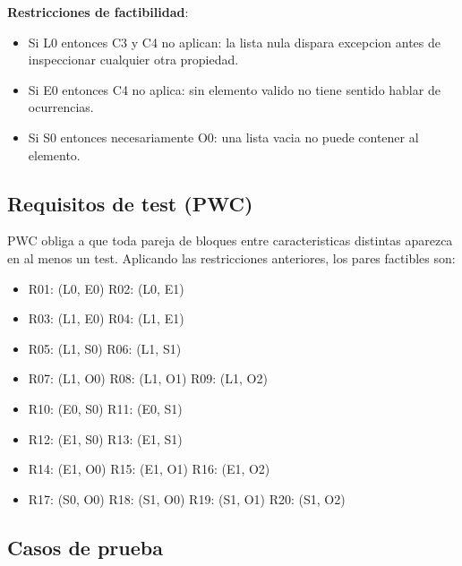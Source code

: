 \documentclass[12pt,a4paper]{article}
\begin{document}
\textbf{Restricciones de factibilidad}:
\begin{itemize}
  \item Si L0 entonces C3 y C4 no aplican: la lista nula dispara excepcion antes de inspeccionar
  cualquier otra propiedad.
  \item Si E0 entonces C4 no aplica: sin elemento valido no tiene sentido hablar de ocurrencias.
  \item Si S0 entonces necesariamente O0: una lista vacia no puede contener al elemento.
\end{itemize}

\subsection{Requisitos de test (PWC)}

PWC obliga a que toda pareja de bloques entre caracteristicas distintas aparezca en al menos un
test. Aplicando las restricciones anteriores, los pares factibles son:

\begin{itemize}[itemsep=0.05em]
  \item R01: (L0, E0) \quad R02: (L0, E1)
  \item R03: (L1, E0) \quad R04: (L1, E1)
  \item R05: (L1, S0) \quad R06: (L1, S1)
  \item R07: (L1, O0) \quad R08: (L1, O1) \quad R09: (L1, O2)
  \item R10: (E0, S0) \quad R11: (E0, S1)
  \item R12: (E1, S0) \quad R13: (E1, S1)
  \item R14: (E1, O0) \quad R15: (E1, O1) \quad R16: (E1, O2)
  \item R17: (S0, O0) \quad R18: (S1, O0) \quad R19: (S1, O1) \quad R20: (S1, O2)
\end{itemize}

\subsection{Casos de prueba}
\end{document}
